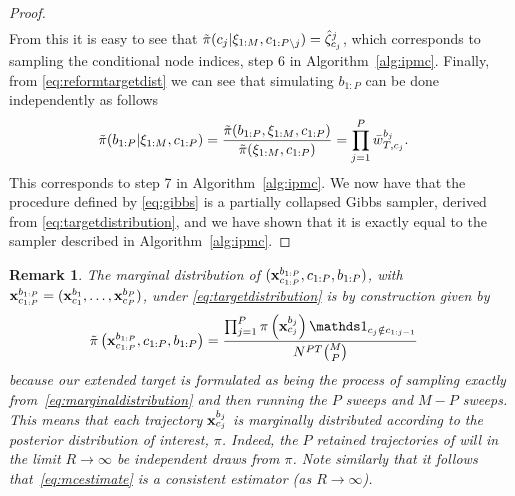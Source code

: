 \begin{proof}
\begin{align*}
	\end{align*}
	From this it is easy to see that $\tilde\pi(c_j | \mathbf{\xi}_{1:M}, c_{1:P\backslash j}) = \hat{\zeta}_{c_j}^j$, which 
	corresponds to sampling the conditional node indices, \ie step 6 in Algorithm~\ref{alg:ipmc}. Finally, from \eqref{eq:reformtargetdist} we can see that simulating $b_{1:P}$ can be done independently as follows
	\begin{align*}
	&\tilde\pi(b_{1:P} | \mathbf{\xi}_{1:M}, c_{1:P}) = \frac{\tilde\pi(b_{1:P} ,\mathbf{\xi}_{1:M}, c_{1:P})}{\tilde\pi(\mathbf{\xi}_{1:M}, c_{1:P})} =  \prod_{j = 1}^P 
	\bar w_{T,c_j}^{b_j}
	.
	\end{align*}
	This corresponds to step 7 in Algorithm~\ref{alg:ipmc}. We now have that the procedure defined 
	by \eqref{eq:gibbs} is a partially collapsed Gibbs sampler, derived from \eqref{eq:targetdistribution}, 
	and we have shown that it is exactly equal to the \ipmcmc sampler described in Algorithm~\ref{alg:ipmc}.
	\vspace{-8pt}
\end{proof}
\newtheorem{rem}{Remark}
\begin{rem}
	The marginal distribution of $(\mathbf{x}_{c_{1:P}}^{b_{1:P}},c_{1:P},b_{1:P})$, with $\mathbf{x}_{c_{1:P}}^{b_{1:P}} = (\mathbf{x}_{c_1}^{b_1},\ldots,\mathbf{x}_{c_P}^{b_P})$, under \eqref{eq:targetdistribution} is by construction given by
	\vspace{-4pt}
	\begin{align}
	\label{eq:marginaldistribution}
	&\tilde \pi\left(\xb_{c_{1:P}}^{b_{1:P}},c_{1:P},b_{1:P}\right) = \frac{\prod_{j = 1}^P \pi\left(\xb_{c_j}^{b_j}\right) \iden_{c_j \notin c_{1:j-1}}}{N^{PT} \binom{M}{P}}
	\end{align}
	because our extended target is formulated as being the process of sampling exactly from~\eqref{eq:marginaldistribution}
	and then running the $P$ \csmc sweeps and $M-P$ \smc sweeps.
	This means that each trajectory $\mathbf{x}_{c_j}^{b_j}$ is marginally distributed according to the
	posterior distribution of interest, $\pi$. Indeed, the $P$ retained trajectories of \ipmcmc
	will in the limit $R \rightarrow \infty$ %
	be independent draws from $\pi$.  Note similarly that it follows that~\eqref{eq:mcestimate}
	is a consistent estimator (as $R\rightarrow\infty$).
	\vspace{-8pt}
\end{rem}
